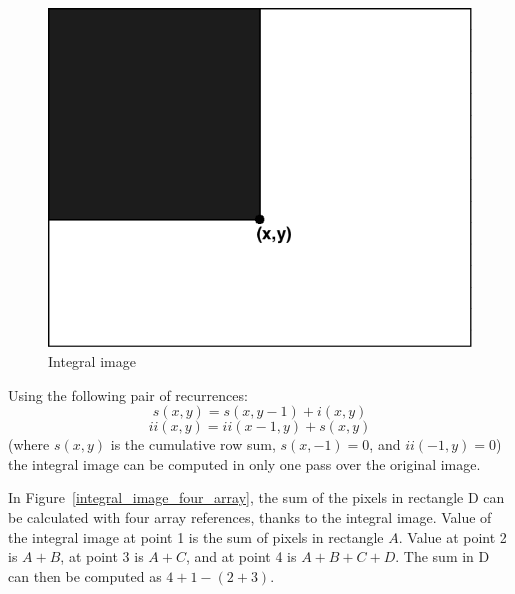 \begin{figure}[!h]
\begin{center}
\noindent \includegraphics[scale=0.3]{figures/integral_image_description} 
\newline
\caption{Integral image}
\label{integral_image_description}
\end{center} 
\end{figure}
	
\noindent Using the following pair of recurrences: 
\begin{equation}
s(x,y) = s(x,y - 1) + i(x,y)
\end{equation}
\begin{equation}
ii(x,y) = ii(x - 1,y) + s(x,y)
\end{equation}
(where $ s(x,y) $ is the cumulative row sum, $ s(x,-1) = 0 $, and $ ii(-1,y) = 0 $) the integral image can be computed in only one pass over the original image. 
\newline

\noindent In Figure~\ref{integral_image_four_array}, the sum of the pixels in rectangle D can be calculated with four array references, thanks to the integral image. Value of the integral image at point 1 is the sum of pixels in rectangle $ A $. Value at point 2 is $ A + B $, at point 3 is $ A + C $, and at  point 4 is $ A + B + C + D $. The sum in D can then be computed as $ 4 + 1 - (2 + 3) $. 
\newline

